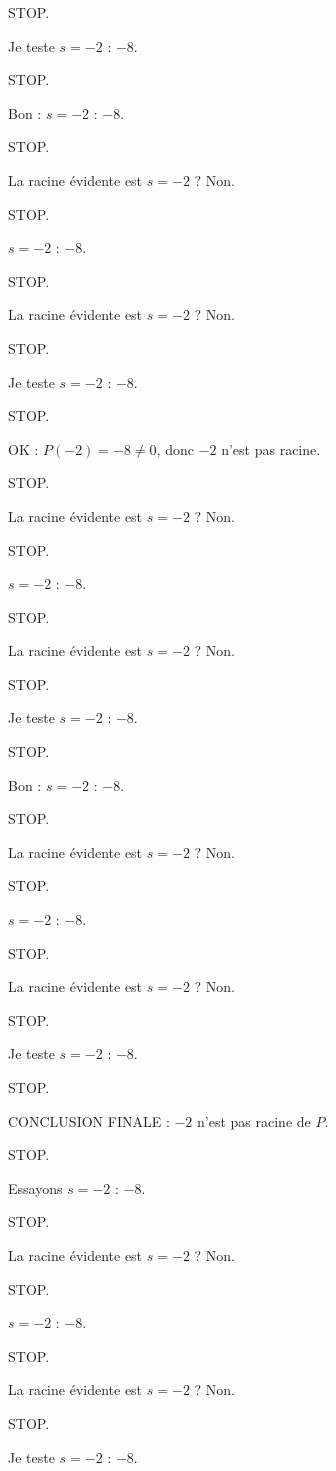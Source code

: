 \documentclass[11pt]{article}
\begin{document}
\begin{exoresolu}
\begin{enumerate}
STOP. 

Je teste $s = -2$ : $-8$. 

STOP. 

Bon : $s = -2$ : $-8$. 

STOP. 

La racine évidente est $s = -2$ ? Non. 

STOP. 

$s = -2$ : $-8$. 

STOP. 

La racine évidente est $s = -2$ ? Non. 

STOP. 

Je teste $s = -2$ : $-8$. 

STOP. 

OK : $P(-2) = -8 \neq 0$, donc $-2$ n'est pas racine. 

STOP. 

La racine évidente est $s = -2$ ? Non. 

STOP. 

$s = -2$ : $-8$. 

STOP. 

La racine évidente est $s = -2$ ? Non. 

STOP. 

Je teste $s = -2$ : $-8$. 

STOP. 

Bon : $s = -2$ : $-8$. 

STOP. 

La racine évidente est $s = -2$ ? Non. 

STOP. 

$s = -2$ : $-8$. 

STOP. 

La racine évidente est $s = -2$ ? Non. 

STOP. 

Je teste $s = -2$ : $-8$. 

STOP. 

CONCLUSION FINALE : $-2$ n'est pas racine de $P$. 

STOP. 

Essayons $s = -2$ : $-8$. 

STOP. 

La racine évidente est $s = -2$ ? Non. 

STOP. 

$s = -2$ : $-8$. 

STOP. 

La racine évidente est $s = -2$ ? Non. 

STOP. 

Je teste $s = -2$ : $-8$. 


\end{enumerate}
\end{exoresolu}
\end{document}
